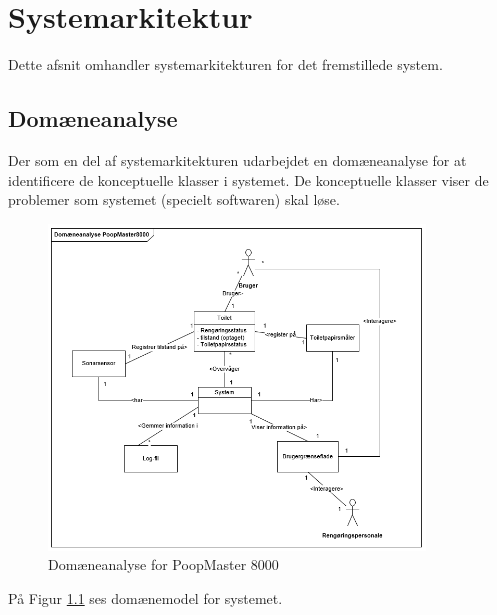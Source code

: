 \chapter{Systemarkitektur}\label{ch:Systemarkitektur}
Dette afsnit omhandler systemarkitekturen for det fremstillede system.

\section{Domæneanalyse}
Der som en del af systemarkitekturen udarbejdet en domæneanalyse for at identificere de konceptuelle klasser i systemet. De konceptuelle klasser viser de problemer som systemet (specielt softwaren) skal løse.

	\begin{figure}[ht!]
		\centering
		\includegraphics[width=100mm]{figures/Domaeneanalyse.png}
		\caption{Domæneanalyse for PoopMaster 8000}
		\label{fig:Domain}
	\end{figure}
	
På Figur \ref{fig:Domain} ses domænemodel for systemet.

